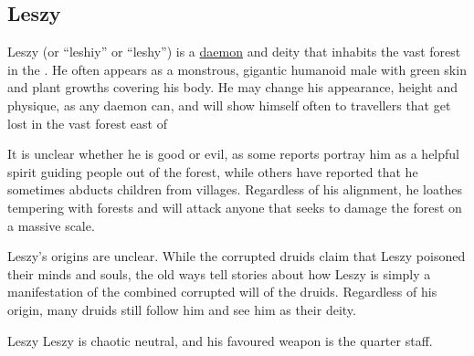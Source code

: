 \subsection{Leszy}
\label{sec:Leszy}

Leszy (or ``leshiy'' or ``leshy'') is a \hyperref[sec:Daemons]{daemon} and
deity that inhabits the vast forest in the . He
often appears as a monstrous, gigantic humanoid male with green skin and plant
growths covering his body. He may change his appearance, height and physique,
as any daemon can, and will show himself often to travellers that get lost in
the vast forest east of 

It is unclear whether he is good or evil, as some reports portray him as a
helpful spirit guiding people out of the forest, while others have reported
that he sometimes abducts children from villages. Regardless of his alignment,
he loathes tempering with forests and will attack anyone that seeks to damage
the forest on a massive scale.

Leszy's origins are unclear. While the corrupted druids claim that Leszy
poisoned their minds and souls, the old ways tell stories about how Leszy is
simply a manifestation of the combined corrupted will of the druids. Regardless
of his origin, many druids still follow him and see him as their deity.

\begin{35e}{Leszy}
  Leszy is chaotic neutral, and his favoured weapon is the quarter staff.
\end{35e}
